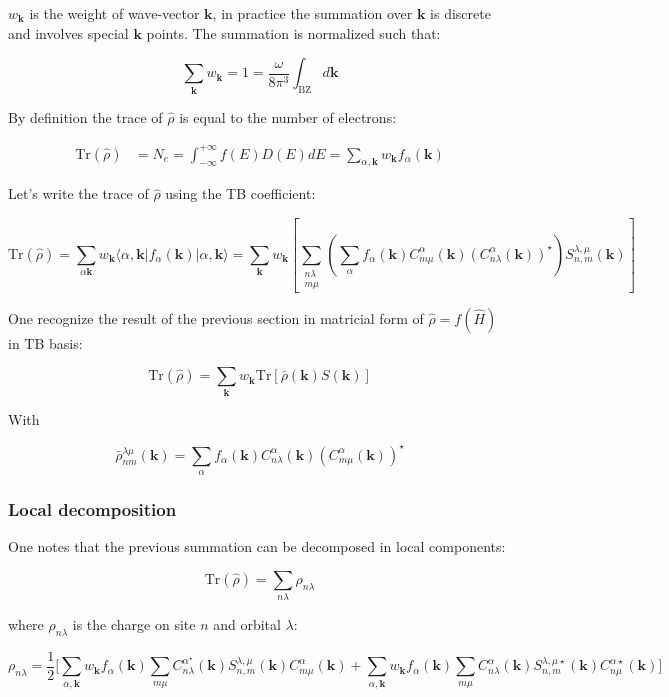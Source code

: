 \documentclass{article}
\newcommand{\bra}[1]{\langle #1|}
\newcommand{\ket}[1]{|#1\rangle}
\newcommand{\op}[1]{\hat{#1}}
\begin{document}
\noindent
$w_{\mathbf{k}}$ is the weight of wave-vector $\mathbf{k}$, in practice the summation over
$\mathbf{k}$ is discrete and involves special $\mathbf{k}$ points. The summation is normalized such that:

\[ \sum_{\mathbf{k}}w_{\mathbf{k}}=1=  \frac{\omega}{8\pi^3}\int_{\mbox{BZ}} d\mathbf{k}\]

\noindent
By definition the trace of $\op{\rho}$ is equal to the number of electrons:

\begin{align}
\mbox{Tr}(\op{\rho})&=N_e= \int_{-\infty}^{+\infty} f(E) D(E)dE
=
\sum_{\alpha,\mathbf{k}} w_{\mathbf{k}} f_{\alpha}(\mathbf{k})
\end{align}

\noindent Let's write the trace of $\op{\rho}$ using the TB coefficient:

\[ \displaystyle \mbox{Tr}(\op{\rho})=
\sum_{\alpha \mathbf{k}} w_{\mathbf{k}} \bra{\alpha,\mathbf{k}} f_{\alpha}(\mathbf{k})\ket{\alpha,\mathbf{k}}
=\sum_{\mathbf{k}} w_{\mathbf{k}} \left[\sum_{\substack{n\lambda\\ m \mu}} 
\left( \sum_{\alpha} f_{\alpha}(\mathbf{k})
C_{m\mu}^{\alpha}(\mathbf{k}) (C_{n \lambda}^{\alpha}(\mathbf{k}))^{\star}\right)
 S_{n,m}^{\lambda,\mu}(\mathbf{k}) \right]
 \]

\noindent
One recognize the result of the previous section in
matricial form of $\op{\rho}=f(\op{ H})$ in TB basis:

\[ \text{Tr}(\op{\rho})=\sum_{\mathbf{k}}w_{\mathbf{k}} \text{Tr}\left[\bar{\rho}(\mathbf{k})S(\mathbf{k})\right] \]

\noindent
With

\[ \bar{\rho}_{n m}^{\lambda \mu}(\mathbf{k})=  \sum_{\alpha} f_{\alpha}(\mathbf{k})
C_{n \lambda}^{\alpha}(\mathbf{k})(C_{m \mu}^{\alpha}(\mathbf{k}))^{\star}    \]

\subsubsection{Local decomposition}

\noindent One notes that the previous summation can be decomposed in local components:

\[ \displaystyle \mbox{Tr}(\op{\rho})=\sum_{n \lambda} \rho_{n
\lambda} \]

\noindent
where $\rho_{n \lambda}$ is the charge on site $n$ and orbital $\lambda$:

\[\rho_{n \lambda}=\frac{1}{2}\Bigg[\sum_{\alpha,\mathbf{k}} w_{\mathbf{k}}
f_{\alpha}(\mathbf{k}) \sum_{m \mu} C_{n
\lambda}^{\alpha ^{\star}}(\mathbf{k})S_{n,m}^{\lambda,\mu}(\mathbf{k})C_{m \mu}^{\alpha}(\mathbf{k}) + \sum_{\alpha,\mathbf{k}}
w_{\mathbf{k}}f_{\alpha}(\mathbf{k}) \sum_{m
\mu} C_{n \lambda}^{\alpha}(\mathbf{k})S_{n,m}^{\lambda,\mu
\star}(\mathbf{k})C_{n \mu}^{\alpha \star}(\mathbf{k}) \Bigg]\]
\end{document}
